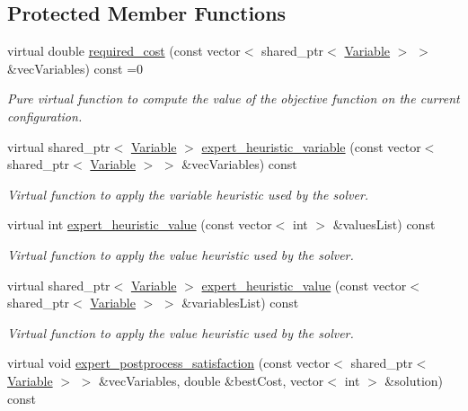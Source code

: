 \subsection*{Protected Member Functions}
\begin{DoxyCompactItemize}
\item 
virtual double \hyperlink{classghost_1_1Objective_acec1affc6bdee383ce13768173a002ac}{required\-\_\-cost} (const vector$<$ shared\-\_\-ptr$<$ \hyperlink{classghost_1_1Variable}{Variable} $>$ $>$ \&vec\-Variables) const =0
\begin{DoxyCompactList}\small\item\em Pure virtual function to compute the value of the objective function on the current configuration. \end{DoxyCompactList}\item 
virtual shared\-\_\-ptr$<$ \hyperlink{classghost_1_1Variable}{Variable} $>$ \hyperlink{classghost_1_1Objective_ae6a19b95543b9cb99268e567381cbeb9}{expert\-\_\-heuristic\-\_\-variable} (const vector$<$ shared\-\_\-ptr$<$ \hyperlink{classghost_1_1Variable}{Variable} $>$ $>$ \&vec\-Variables) const 
\begin{DoxyCompactList}\small\item\em Virtual function to apply the variable heuristic used by the solver. \end{DoxyCompactList}\item 
virtual int \hyperlink{classghost_1_1Objective_ad999222b30e17cbe8368adcb8748c932}{expert\-\_\-heuristic\-\_\-value} (const vector$<$ int $>$ \&values\-List) const 
\begin{DoxyCompactList}\small\item\em Virtual function to apply the value heuristic used by the solver. \end{DoxyCompactList}\item 
virtual shared\-\_\-ptr$<$ \hyperlink{classghost_1_1Variable}{Variable} $>$ \hyperlink{classghost_1_1Objective_a074f1cdf71b4adb24b3fa3de61ebbc9b}{expert\-\_\-heuristic\-\_\-value} (const vector$<$ shared\-\_\-ptr$<$ \hyperlink{classghost_1_1Variable}{Variable} $>$ $>$ \&variables\-List) const 
\begin{DoxyCompactList}\small\item\em Virtual function to apply the value heuristic used by the solver. \end{DoxyCompactList}\item 
virtual void \hyperlink{classghost_1_1Objective_a0c25580f0fa74c3b919b4e5bec92be84}{expert\-\_\-postprocess\-\_\-satisfaction} (const vector$<$ shared\-\_\-ptr$<$ \hyperlink{classghost_1_1Variable}{Variable} $>$ $>$ \&vec\-Variables, double \&best\-Cost, vector$<$ int $>$ \&solution) const 

\end{DoxyCompactItemize}
